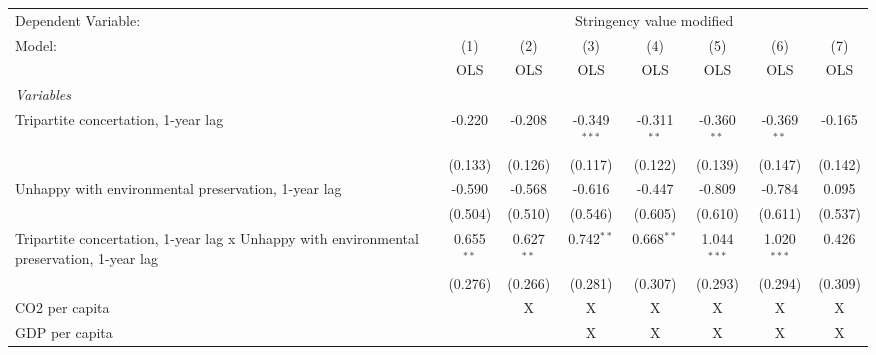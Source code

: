 
\begingroup
\centering
\begin{tabular}{lccccccc}
   \toprule
   Dependent Variable: & \multicolumn{7}{c}{Stringency value modified}\\
   Model:                                                                                    & (1)          & (2)          & (3)            & (4)           & (5)           & (6)           & (7)\\  
                                                                                             &  OLS         & OLS          & OLS            & OLS           & OLS           & OLS           & OLS\\  
   \midrule
   \emph{Variables}\\
   Tripartite concertation, 1-year lag                                                       & -0.220       & -0.208       & -0.349$^{***}$ & -0.311$^{**}$ & -0.360$^{**}$ & -0.369$^{**}$ & -0.165\\   
                                                                                             & (0.133)      & (0.126)      & (0.117)        & (0.122)       & (0.139)       & (0.147)       & (0.142)\\   
   Unhappy with environmental preservation, 1-year lag                                       & -0.590       & -0.568       & -0.616         & -0.447        & -0.809        & -0.784        & 0.095\\   
                                                                                             & (0.504)      & (0.510)      & (0.546)        & (0.605)       & (0.610)       & (0.611)       & (0.537)\\   
   Tripartite concertation, 1-year lag x Unhappy with environmental preservation, 1-year lag & 0.655$^{**}$ & 0.627$^{**}$ & 0.742$^{**}$   & 0.668$^{**}$  & 1.044$^{***}$ & 1.020$^{***}$ & 0.426\\   
                                                                                             & (0.276)      & (0.266)      & (0.281)        & (0.307)       & (0.293)       & (0.294)       & (0.309)\\   
   CO2 per capita                                                                            &              & X            & X              & X             & X             & X             & X\\  
   GDP per capita                                                                            &              &              & X              & X             & X             & X             & X\\  

\end{tabular}
